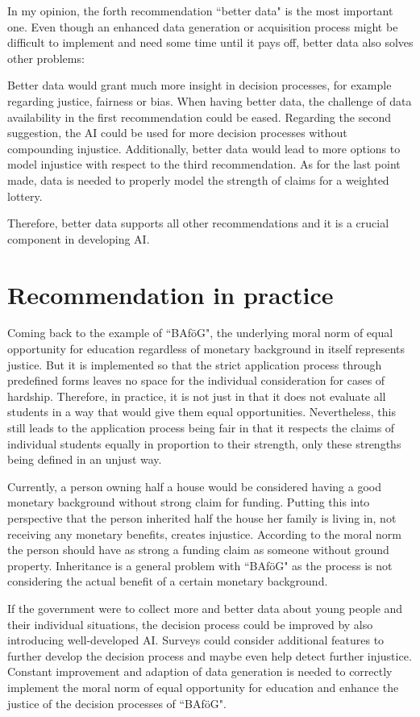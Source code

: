 In my opinion, the forth recommendation ``better data" is the most important one.
Even though an enhanced data generation or acquisition process might be difficult to implement and need some time until it pays off, better data also solves other problems:

Better data would grant much more insight in decision processes, for example regarding justice, fairness or bias.
When having better data, the challenge of data availability in the first recommendation could be eased.
Regarding the second suggestion, the AI could be used for more decision processes without compounding injustice.
Additionally, better data would lead to more options to model injustice with respect to the third recommendation.
As for the last point made, data is needed to properly model the strength of claims for a weighted lottery.

Therefore, better data supports all other recommendations and it is a crucial component in developing AI.

\section*{Recommendation in practice}

Coming back to the example of ``BAföG", the underlying moral norm of equal opportunity for education regardless of monetary background in itself represents justice.
But it is implemented so that the strict application process through predefined forms leaves no space for the individual consideration for cases of hardship.
Therefore, in practice, it is not just in that it does not evaluate all students in a way that would give them equal opportunities.
Nevertheless, this still leads to the application process being fair in that it respects the claims of individual students equally in proportion to their strength, only these strengths being defined in an unjust way.

Currently, a person owning half a house would be considered having a good monetary background without strong claim for funding.
Putting this into perspective that the person inherited half the house her family is living in, not receiving any monetary benefits, creates injustice.
According to the moral norm the person should have as strong a funding claim as someone without ground property.
Inheritance is a general problem with ``BAföG" as the process is not considering the actual benefit of a certain monetary background.

If the government were to collect more and better data about young people and their individual situations, the decision process could be improved by also introducing well-developed AI.
Surveys could consider additional features to further develop the decision process and maybe even help detect further injustice.
Constant improvement and adaption of data generation is needed to correctly implement the moral norm of equal opportunity for education and enhance the justice of the decision processes of ``BAföG".